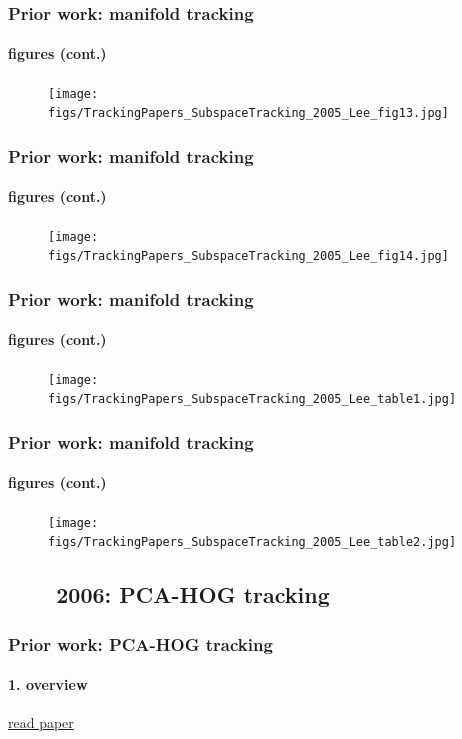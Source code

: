 \begin{frame}
\frametitle{Prior work: manifold tracking}
\framesubtitle{figures (cont.)}
\logoCSIPCPL\mypagenum
	\begin{figure}
		\texttt{[image: figs/TrackingPapers\_SubspaceTracking\_2005\_Lee\_fig13.jpg]}
	\end{figure}
\end{frame}


\begin{frame}
\frametitle{Prior work: manifold tracking}
\framesubtitle{figures (cont.)}
\logoCSIPCPL\mypagenum
	\begin{figure}
		\texttt{[image: figs/TrackingPapers\_SubspaceTracking\_2005\_Lee\_fig14.jpg]}
	\end{figure}
\end{frame}

\begin{frame}
\frametitle{Prior work: manifold tracking}
\framesubtitle{figures (cont.)}
\logoCSIPCPL\mypagenum
	\begin{figure}
		\texttt{[image: figs/TrackingPapers\_SubspaceTracking\_2005\_Lee\_table1.jpg]}
	\end{figure}
\end{frame}



\begin{frame}
\frametitle{Prior work: manifold tracking}
\framesubtitle{figures (cont.)}
\logoCSIPCPL\mypagenum
	\begin{figure}
		\texttt{[image: figs/TrackingPapers\_SubspaceTracking\_2005\_Lee\_table2.jpg]}
	\end{figure}
\end{frame}



\subsection{\ \ \ \ 2006: PCA-HOG tracking}
\begin{frame}
\frametitle{Prior work: PCA-HOG tracking}
\framesubtitle{1. overview}
\logoCSIPCPL\mypagenum
	{\color{blue}  \href{http://users.ece.gatech.edu/~msalman/papers/2006 CNF, Simultaneous Tracking and Action Recognition using the PCA-HOG Descriptor (Lu).pdf}{read paper}}
\end{frame}




